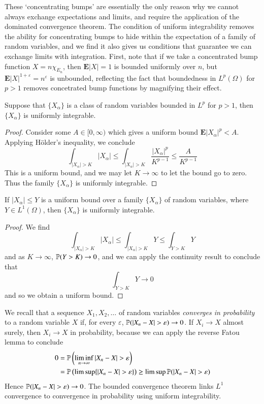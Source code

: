 These `concentrating bumps' are essentially the only reason why we cannot always exchange expectations and limits, and require the application of the dominated convergence theorem. The condition of uniform integrability removes the ability for concentrating bumps to hide within the expectation of a family of random variables, and we find it also gives us conditions that guarantee we can exchange limits with integration. First, note that if we take a concentrated bump function $X = n \chi_{E_n}$, then $\mathbf{E}|X| = 1$ is bounded uniformly over $n$, but $\mathbf{E}|X|^{1+\varepsilon} = n^\varepsilon$ is unbounded, reflecting the fact that boundedness in $L^p(\Omega)$ for $p > 1$ removes concetrated bump functions by magnifying their effect.

\begin{theorem}
    Suppose that $\{ X_\alpha \}$ is a class of random variables bounded in $L^p$ for $p > 1$, then $\{ X_\alpha \}$ is uniformly integrable.
\end{theorem}
\begin{proof}
    Consider some $A \in [0,\infty)$ which gives a uniform bound $\mathbf{E} |X_\alpha|^p < A$. Applying H\"{o}lder's inequality, we conclude
    \[ \int_{|X_\alpha| > K} |X_\alpha| \leq \int_{|X_\alpha| > K} \frac{|X_\alpha|^p}{K^{p-1}} \leq \frac{A}{K^{p-1}} \]
    This is a uniform bound, and we may let $K \to \infty$ to let the bound go to zero. Thus the family $\{ X_\alpha \}$ is uniformly integrable.
\end{proof}

\begin{corollary}
    If $|X_\alpha| \leq Y$ is a uniform bound over a family $\{ X_\alpha \}$ of random variables, where $Y \in L^1(\Omega)$, then $\{ X_\alpha \}$ is uniformly integrable.
\end{corollary}
\begin{proof}
    We find
    \[ \int_{|X_\alpha| > K} |X_\alpha| \leq \int_{|X_\alpha| > K} Y \leq \int_{Y > K} Y \]
    and as $K \to \infty$, $\operatorname{\mathbb{P}}(Y > K) \to 0$, and we can apply the continuity result to conclude that
    \[ \int_{Y > K} Y \to 0 \]
    and so we obtain a uniform bound.
\end{proof}

We recall that a sequence $X_1, X_2, \dots$ of random variables \emph{converges in probability} to a random variable $X$ if, for every $\varepsilon$, $\operatorname{\mathbb{P}}(|X_n - X| > \varepsilon) \to 0$. If $X_i \to X$ almost surely, then $X_i \to X$ in probability, because we can apply the reverse Fatou lemma to conclude
%
\begin{align*}
    0 &= \operatorname{\mathbb{P}} \left( \liminf_{n \to \infty} |X_n - X| > \varepsilon \right)\\
    &= \operatorname{\mathbb{P}} \left( \limsup \{ |X_n - X| > \varepsilon \} \right) \geq \limsup \operatorname{\mathbb{P}}(|X_n - X| > \varepsilon)
\end{align*}
%
Hence $\operatorname{\mathbb{P}}(|X_n - X| > \varepsilon) \to 0$. The bounded convergence theorem links $L^1$ convergence to convergence in probability using uniform integrability.


